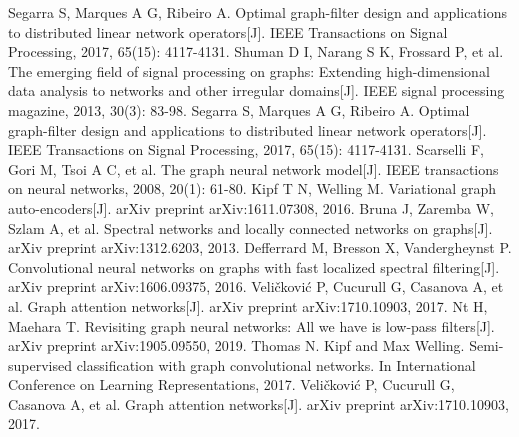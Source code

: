 \begin{thebibliography}{99}
     Segarra S, Marques A G, Ribeiro A. Optimal graph-filter design and applications to distributed linear network operators[J]. IEEE Transactions on Signal Processing, 2017, 65(15): 4117-4131.
     Shuman D I, Narang S K, Frossard P, et al. The emerging field of signal processing on graphs: Extending high-dimensional data analysis to networks and other irregular domains[J]. IEEE signal processing magazine, 2013, 30(3): 83-98.
     Segarra S, Marques A G, Ribeiro A. Optimal graph-filter design and applications to distributed linear network operators[J]. IEEE Transactions on Signal Processing, 2017, 65(15): 4117-4131.
     Scarselli F, Gori M, Tsoi A C, et al. The graph neural network model[J]. IEEE transactions on neural networks, 2008, 20(1): 61-80.
     Kipf T N, Welling M. Variational graph auto-encoders[J]. arXiv preprint arXiv:1611.07308, 2016.
     Bruna J, Zaremba W, Szlam A, et al. Spectral networks and locally connected networks on graphs[J]. arXiv preprint arXiv:1312.6203, 2013.
     Defferrard M, Bresson X, Vandergheynst P. Convolutional neural networks on graphs with fast localized spectral filtering[J]. arXiv preprint arXiv:1606.09375, 2016.
     Veličković P, Cucurull G, Casanova A, et al. Graph attention networks[J]. arXiv preprint arXiv:1710.10903, 2017.
     Nt H, Maehara T. Revisiting graph neural networks: All we have is low-pass filters[J]. arXiv preprint arXiv:1905.09550, 2019.
     Thomas N. Kipf and Max Welling. Semi-supervised classification with graph convolutional networks. In International Conference on Learning Representations, 2017.
     Veličković P, Cucurull G, Casanova A, et al. Graph attention networks[J]. arXiv preprint arXiv:1710.10903, 2017.    
\end{thebibliography}

